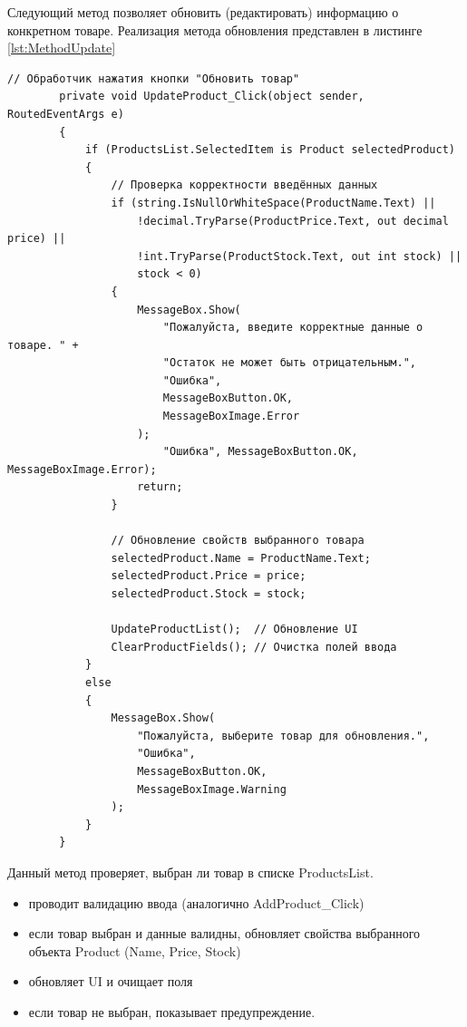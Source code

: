 \documentclass[12pt]{article}
\newcommand{\colorGIT}[1]{\textcolor{CtpGreen}{#1}}
\begin{document}
\newpage

Следующий метод позволяет обновить (редактировать) информацию о конкретном товаре. Реализация метода обновления представлен в листинге \ref{lst:MethodUpdate}

\begin{lstlisting}[style=csharp_catppuccin, caption=\colorGIT{\href{https://github.com/WebMasterIT/Csharp_Labs/blob/ec375afd16c0647b337cf3d8a79c8bef904fc1be/3lab/StoreManager/MainWindow.xaml.cs\#L82-L110}{Метод}} обновления нового товара, label=lst:MethodUpdate]
        // Обработчик нажатия кнопки "Обновить товар"
        private void UpdateProduct_Click(object sender, RoutedEventArgs e)
        {
            if (ProductsList.SelectedItem is Product selectedProduct)
            {
                // Проверка корректности введённых данных
                if (string.IsNullOrWhiteSpace(ProductName.Text) ||
                    !decimal.TryParse(ProductPrice.Text, out decimal price) ||
                    !int.TryParse(ProductStock.Text, out int stock) ||
                    stock < 0)
                {
                    MessageBox.Show(
                        "Пожалуйста, введите корректные данные о товаре. " +
                        "Остаток не может быть отрицательным.",
                        "Ошибка",
                        MessageBoxButton.OK,
                        MessageBoxImage.Error
                    );
                        "Ошибка", MessageBoxButton.OK, MessageBoxImage.Error);
                    return;
                }

                // Обновление свойств выбранного товара
                selectedProduct.Name = ProductName.Text;
                selectedProduct.Price = price;
                selectedProduct.Stock = stock;

                UpdateProductList();  // Обновление UI
                ClearProductFields(); // Очистка полей ввода
            }
            else
            {
                MessageBox.Show(
                    "Пожалуйста, выберите товар для обновления.",
                    "Ошибка",
                    MessageBoxButton.OK,
                    MessageBoxImage.Warning
                );
            }
        }
\end{lstlisting}


Данный метод проверяет, выбран ли товар в списке ProductsList.
\begin{itemize}
	\item проводит валидацию ввода (аналогично AddProduct\_Click)
	\item если товар выбран и данные валидны, обновляет свойства выбранного объекта Product (Name, Price, Stock)
	\item обновляет UI и очищает поля
	\item если товар не выбран, показывает предупреждение.
\end{itemize}
\end{document}
